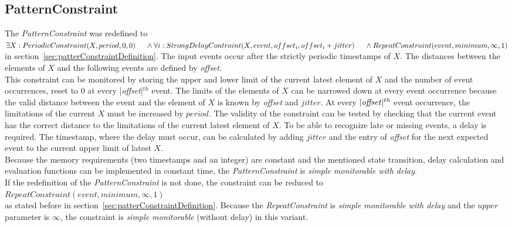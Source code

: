 \subsection{PatternConstraint}
	The \emph{PatternConstraint} was redefined to\\[10pt]
	\begin{math}
		\exists X: PeriodicConstraint(X, period, 0, 0)\\
		\text{\hspace{.5cm}} \land \forall i: StrongDelayContraint(X, event, offset_i, offset_i+jitter)\\
		\text{\hspace{.5cm}} \land RepeatConstraint(event, minimum, \infty, 1)
	\end{math}\\[10pt]
	in section~\ref{sec:patterConstraintDefinition}. The input events occur after the strictly periodic timestamps of $X$. The distances between the elements of $X$ and the following events are defined by \textit{offset}.\\
	This constraint can be monitored by storing the upper and lower limit of the current latest element of $X$ and the number of event occurrences, reset to 0 at every |\emph{offset}|$^{th}$ event. The limits of the elements of $X$ can be narrowed down at every event occurrence because the valid distance between the event and the element of $X$ is known by \emph{offset} and $jitter$. At every $|\text{\emph{offset}}|^{th}$ event occurrence, the limitations of the current $X$ must be increased by $period$. The validity of the constraint can be tested by checking that the current event has the correct distance to the limitations of the current latest element of $X$. To be able to recognize late or missing events, a delay is required. The timestamp, where the delay must occur, can be calculated by adding $jitter$ and the entry of \textit{offset} for the next expected event to the current upper limit of latest $X$.\\
	Because the memory requirements (two timestamps and an integer) are constant and the mentioned state transition, delay calculation and evaluation functions can be implemented in constant time, the \emph{PatternConstraint} is \textit{simple monitorable with delay}.\\[10 pt]
	If the redefinition of the \emph{PatternConstraint} is not done, the constraint can be reduced to\\[10pt]
	\begin{math}
		RepeatConstraint(event, minimum, \infty, 1)
	\end{math}\\[10pt]
	as stated before in section~\ref{sec:patterConstraintDefinition}. Because the \textit{RepeatConstraint} is \textit{simple monitorable with delay} and the $upper$ parameter is $\infty$, the constraint is \textit{simple monitorable} (without delay) in this variant.
	
